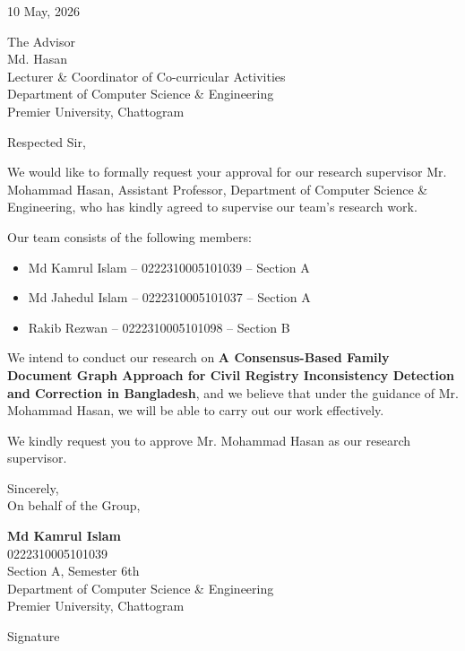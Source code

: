 \documentclass[12pt,a4paper]{article}
\begin{document}
\begin{flushleft}
10 May, 2026
\end{flushleft}

\vspace{0.4cm}

\begin{flushleft}
The Advisor\\
Md. Hasan\\
Lecturer \& Coordinator of Co-curricular Activities\\
Department of Computer Science \& Engineering\\
Premier University, Chattogram
\end{flushleft}

\vspace{0.4cm}

\noindent
Respected Sir,

\vspace{0.25cm}

\noindent
We would like to formally request your approval for our research supervisor
Mr. Mohammad Hasan, Assistant Professor, Department of Computer Science \&
Engineering, who has kindly agreed to supervise our team's research work.

\vspace{0.25cm}

\noindent
Our team consists of the following members:

\vspace{0.2cm}

\begin{itemize}
    \item Md Kamrul Islam -- 0222310005101039 -- Section A
    \item Md Jahedul Islam -- 0222310005101037 -- Section A
    \item Rakib Rezwan -- 0222310005101098 -- Section B
\end{itemize}

\vspace{0.25cm}

\noindent
We intend to conduct our research on \textbf{A Consensus-Based Family Document
Graph Approach for Civil Registry Inconsistency Detection and Correction in
Bangladesh}, and we believe that under the guidance of Mr. Mohammad Hasan, we
will be able to carry out our work effectively.

\vspace{0.25cm}

\noindent
We kindly request you to approve Mr. Mohammad Hasan as our research supervisor.

\vspace{0.7cm}

\noindent
Sincerely,\\
On behalf of the Group,

\vspace{0.9cm}

\noindent
\textbf{Md Kamrul Islam}\\
0222310005101039\\
Section A, Semester 6th\\
Department of Computer Science \& Engineering\\
Premier University, Chattogram

\vspace{1.1cm}

\noindent
Signature
\end{document}
